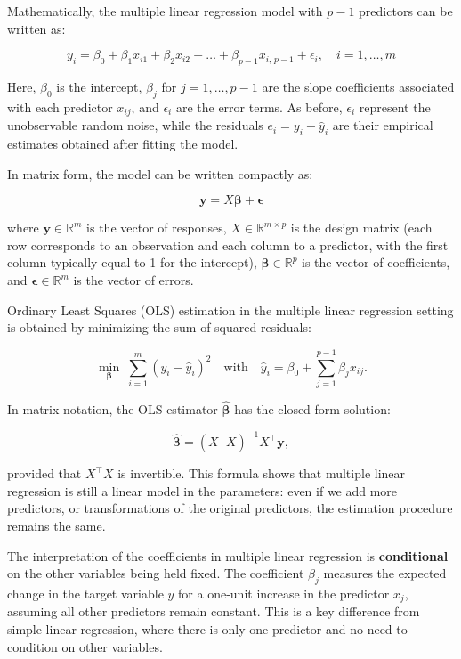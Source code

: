 Mathematically, the multiple linear regression model with $p - 1$ predictors can be written as:

\[
y_i = \beta_0 + \beta_1 x_{i1} + \beta_2 x_{i2} + \dots + \beta_{p-1} x_{i,\,p-1} + \epsilon_i, \quad i = 1, \dots, m
\]

Here, $\beta_0$ is the intercept, $\beta_j$ for $j = 1, \dots, p-1$ are the slope coefficients associated with each predictor $x_{ij}$, and $\epsilon_i$ are the error terms. As before, $\epsilon_i$ represent the unobservable random noise, while the residuals $e_i = y_i - \hat{y}_i$ are their empirical estimates obtained after fitting the model.

In matrix form, the model can be written compactly as:

\[
\mathbf{y} = X \boldsymbol{\beta} + \boldsymbol{\epsilon}
\]

where $\mathbf{y} \in \mathbb{R}^m$ is the vector of responses,
$X \in \mathbb{R}^{m \times p}$ is the design matrix (each row corresponds to an observation and each column to a predictor, with the first column typically equal to 1 for the intercept),
$\boldsymbol{\beta} \in \mathbb{R}^p$ is the vector of coefficients,
and $\boldsymbol{\epsilon} \in \mathbb{R}^m$ is the vector of errors.


Ordinary Least Squares (OLS) estimation in the multiple linear regression setting is obtained by minimizing the sum of squared residuals:

\[
\min_{\boldsymbol{\beta}} \; \sum_{i=1}^{m} (y_i - \hat{y}_i)^2
\quad\text{with}\quad
\hat{y}_i = \beta_0 + \sum_{j=1}^{p-1} \beta_j x_{ij}.
\]

In matrix notation, the OLS estimator $\hat{\boldsymbol{\beta}}$ has the closed-form solution:

\[
\hat{\boldsymbol{\beta}} = (X^\top X)^{-1} X^\top \mathbf{y},
\]

provided that $X^\top X$ is invertible. This formula shows that multiple linear regression is still a linear model in the parameters: even if we add more predictors, or transformations of the original predictors, the estimation procedure remains the same.

The interpretation of the coefficients in multiple linear regression is \textbf{conditional} on the other variables being held fixed. The coefficient $\beta_j$ measures the expected change in the target variable $y$ for a one-unit increase in the predictor $x_j$, assuming all other predictors remain constant. This is a key difference from simple linear regression, where there is only one predictor and no need to condition on other variables.

